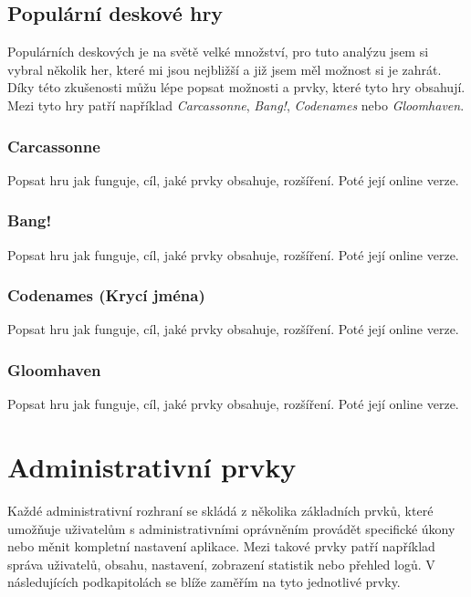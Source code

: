 \subsection{Populární deskové hry}
\label{subsec:popular-board-games-analysis-popular-games}
Populárních deskových je na světě velké množství, pro tuto analýzu jsem si vybral několik her, které mi jsou nejbližší a již jsem měl možnost si je zahrát. Díky této zkušenosti můžu lépe popsat možnosti a prvky, které tyto hry obsahují. Mezi tyto hry patří například \textit{Carcassonne}, \textit{Bang!}, \textit{Codenames} nebo \textit{Gloomhaven}.

\subsubsection{Carcassonne}
\label{subsubsec:popular-board-games-analysis-carcassonne}
Popsat hru jak funguje, cíl, jaké prvky obsahuje, rozšíření. Poté její online verze.

\subsubsection{Bang!}
\label{subsubsec:popular-board-games-analysis-bang}
Popsat hru jak funguje, cíl, jaké prvky obsahuje, rozšíření. Poté její online verze.

\subsubsection{Codenames (Krycí jména)}
\label{subsubsec:popular-board-games-analysis-codenames}
Popsat hru jak funguje, cíl, jaké prvky obsahuje, rozšíření. Poté její online verze.

\subsubsection{Gloomhaven}
\label{subsubsec:popular-board-games-analysis-gloomhaven}
Popsat hru jak funguje, cíl, jaké prvky obsahuje, rozšíření. Poté její online verze.

\section{Administrativní prvky}
\label{sec:admin-elements}
Každé administrativní rozhraní se skládá z několika základních prvků, které umožňuje uživatelům s administrativními oprávněním provádět specifické úkony nebo měnit kompletní nastavení aplikace. Mezi takové prvky patří například správa uživatelů, obsahu, nastavení, zobrazení statistik nebo přehled logů. V následujících podkapitolách se blíže zaměřím na tyto jednotlivé prvky.

